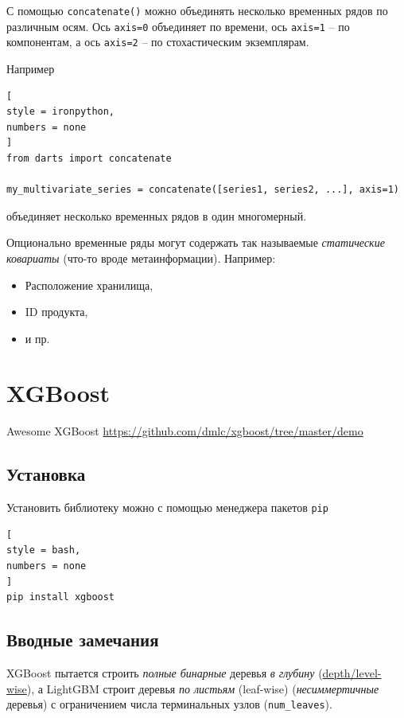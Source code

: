\documentclass[%
	11pt,
	a4paper,
	utf8,
		]{article}
\begin{document}
С помощью \verb|concatenate()| можно объединять несколько временных рядов по различным осям. Ось \verb|axis=0| объединяет по времени, ось \verb|axis=1| -- по компонентам, а ось \verb|axis=2| -- по стохастическим экземплярам.

Например
\begin{lstlisting}[
style = ironpython,
numbers = none
]
from darts import concatenate

my_multivariate_series = concatenate([series1, series2, ...], axis=1)
\end{lstlisting}
объединяет несколько временных рядов в один многомерный.

Опционально временные ряды могут содержать так называемые \emph{статические ковариаты} (что-то вроде метаинформации). Например:
\begin{itemize}
	\item Расположение хранилища,
	
	\item ID продукта,
	
	\item и пр.
\end{itemize}






\section{XGBoost}

Awesome XGBoost \url{https://github.com/dmlc/xgboost/tree/master/demo}

\subsection{Установка}

Установить библиотеку можно с помощью менеджера пакетов \verb|pip|
\begin{lstlisting}[
style = bash,
numbers = none	
]
pip install xgboost
\end{lstlisting}

\subsection{Вводные замечания}

XGBoost пытается строить \emph{полные бинарные} деревья \emph{в глубину} (\href{https://lightgbm.readthedocs.io/en/latest/Experiments.html}{depth/level-wise}), а LightGBM строит деревья \emph{по листьям} (leaf-wise) (\emph{несиммертичные} деревья) с ограничением числа терминальных узлов (\verb|num_leaves|).
\end{document}
